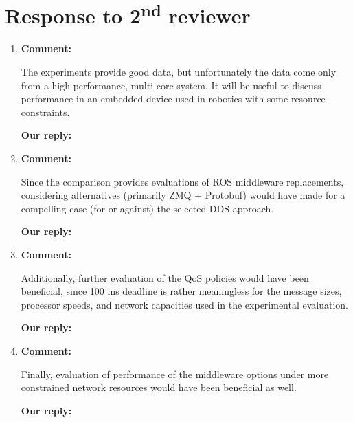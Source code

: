 \documentclass{article}
\newcommand\nd{\textsuperscript{nd}\xspace}
\begin{document}
\section{Response to 2\nd reviewer}
\begin{enumerate}

\item \begin{flushleft}
  \textbf{Comment:}
\end{flushleft}
The experiments provide good data, but unfortunately the data come only from a high-performance, multi-core system. It will be useful to discuss performance in an embedded device used in robotics with some resource constraints.

\begin{flushleft}
  \textbf{Our reply:}
\end{flushleft}


\item \begin{flushleft}
  \textbf{Comment:}
\end{flushleft}
Since the comparison provides evaluations of ROS middleware replacements, considering alternatives (primarily ZMQ + Protobuf) would have made for a compelling case (for or against) the selected DDS approach.

\begin{flushleft}
  \textbf{Our reply:}
\end{flushleft}


\item \begin{flushleft}
  \textbf{Comment:}
\end{flushleft}
Additionally, further evaluation of the QoS policies would have been beneficial, since 100 ms deadline is rather meaningless for the message sizes,
processor speeds, and network capacities used in the experimental evaluation.

\begin{flushleft}
  \textbf{Our reply:}
\end{flushleft}


\item \begin{flushleft}
  \textbf{Comment:}
\end{flushleft}
Finally, evaluation of performance of the middleware options under more constrained network resources would have been beneficial as well.

\begin{flushleft}
  \textbf{Our reply:}
\end{flushleft}

\end{enumerate}
\end{document}
